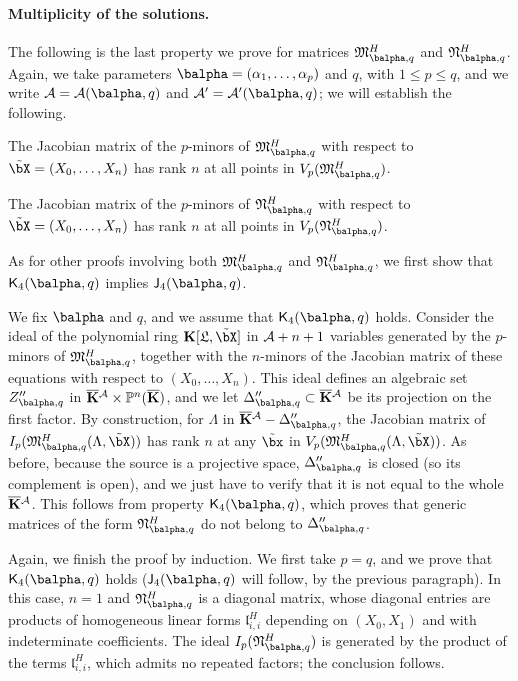 \documentclass[12pt]{article}
\begin{document}
\paragraph{Multiplicity of the solutions.} 
The following is the last property we prove for matrices 
$\mathfrak{M}^H_{\balpha,q}$ and $\mathfrak{N}^H_{\balpha,q}$.
Again, we take parameters $\balpha=(\alpha_1,\dots,\alpha_p)$ and $q$,
with $1 \le p \le q$, and we write ${\cal A}={\cal A}(\balpha,q)$ and
${\cal A}'={\cal A}'(\balpha,q)$; we will establish the following.
\begin{description}[leftmargin=*]
\item[$\assI_4(\balpha,q).$] The Jacobian matrix of
  the $p$-minors of $\mathfrak{M}^H_{\balpha,q}$ with respect to
  $\tilde\bX=(X_0,\dots,X_n)$ has rank $n$ at all points in
  $V_p(\mathfrak{M}^H_{\balpha,q})$.
\item[$\assJ_4(\balpha,q).$] The Jacobian matrix of
  the $p$-minors of $\mathfrak{N}^H_{\balpha,q}$ with respect to
  $\tilde\bX=(X_0,\dots,X_n)$ has rank $n$ at all points in
  $V_p(\mathfrak{N}^H_{\balpha,q})$.
\end{description}
As for other proofs involving both $\mathfrak{M}^H_{\balpha,q}$ and
$\mathfrak{N}^H_{\balpha,q}$, we first show that $\assJ_4(\balpha,q)$
implies $\assI_4(\balpha,q)$.

We fix $\balpha$ and $q$, and we assume that $\assJ_4(\balpha,q)$
holds. Consider the ideal of the polynomial ring
$\KK[\mathfrak{L},\tilde\bX]$ in ${\cal A}+n+1$ variables generated by the
$p$-minors of $\mathfrak{M}^H_{\balpha,q}$, together with the
$n$-minors of the Jacobian matrix of these equations with respect to
$(X_0,\dots,X_n)$. This ideal defines an algebraic set
$Z''_{\balpha,q}$ in $\overline{\mathbf{K}}{}^{\cal A} \times \mathbb{P}^n(\overline{\mathbf{K}})$, and we let
$\Delta''_{\balpha,q} \subset \KKbar{}^{\cal A}$ be its projection on the
first factor. By construction, for $\Lambda$ in
$\KKbar{}^{\cal A}-\Delta''_{\balpha,q}$, the Jacobian matrix of
$I_p(\mathfrak{M}^H_{\balpha,q}(\Lambda,\tilde\bX))$ has rank $n$ at
any $\tilde\bx$ in
$V_p(\mathfrak{M}^H_{\balpha,q}(\Lambda,\tilde\bX))$. As before,
because the source is a projective space, $\Delta''_{\balpha,q}$ is closed
(so its complement is open), and we just have to verify that it is not
equal to the whole $\overline{\mathbf{K}}{}^{\cal A}$. This follows from property
$\assJ_4(\balpha,q)$, which proves that generic matrices of the form
$\mathfrak{N}^H_{\balpha,q}$ do not belong to $\Delta''_{\balpha,q}$.

Again, we finish the proof by induction. We first take $p=q$, and we
prove that $\assJ_4(\balpha,q)$ holds ($\assI_4(\balpha,q)$ will
follow, by the previous paragraph). In this case, $n=1$ and
$\mathfrak{N}^H_{\balpha,q}$ is a diagonal matrix, whose diagonal
entries are products of homogeneous linear forms
$\mathfrak{l}^H_{i,i}$ depending on $(X_0,X_1)$ and with indeterminate
coefficients. The ideal $I_p(\mathfrak{N}^H_{\balpha,q})$ is generated
by the product of the terms $\mathfrak{l}^H_{i,i}$, which admits no
repeated factors; the conclusion follows.
\end{document}
